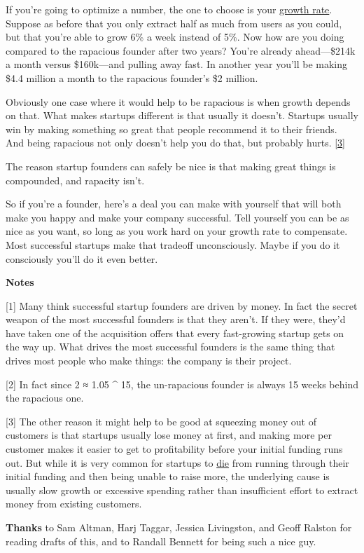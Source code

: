 If you're going to optimize a number, the one to choose is your
\href{http://www.paulgraham.com/growth.html}{growth rate}. Suppose as before that you only extract half as much
from users as you could, but that you're able to grow 6\% a week
instead of 5\%.  Now how are you doing compared to the rapacious
founder after two years?  You're already ahead---\$214k a month
versus \$160k---and pulling away fast.  In another year you'll be
making \$4.4 million a month to the rapacious founder's \$2 million.

Obviously one case where it would help to be rapacious is when
growth depends on that.  What makes startups different is that
usually it doesn't. Startups usually win by making something so
great that people recommend it to their friends.  And being rapacious
not only doesn't help you do that, but probably hurts.  
[\href{\#f3n}{3}]

The reason startup founders can safely be nice is that making great
things is compounded, and rapacity isn't.

So if you're a founder, here's a deal you can make with yourself
that will both make you happy and make your company successful.
Tell yourself you can be as nice as you want, so long as you work
hard on your growth rate to compensate.  Most successful startups
make that tradeoff unconsciously. Maybe if you do it consciously
you'll do it even better.







\textbf{Notes}

[1]
Many think successful startup founders are driven by money.
In fact the secret weapon of the most successful founders is that
they aren't.  If they were, they'd have taken one of the acquisition
offers that every fast-growing startup gets on the way up.  What
drives the most successful founders is the same thing that drives
most people who make things: the company is their project.

[2]
In fact since 2 ≈ 1.05 \textasciicircum{} 15, the un-rapacious founder is
always 15 weeks behind the rapacious one.

[3]
The other reason it might help to be good at squeezing money
out of customers is that startups usually lose money at first, and
making more per customer makes it easier to get to profitability
before your initial funding runs out.  But while it is very common
for startups to \href{http://www.paulgraham.com/pinch.html}{die}
from running through their initial funding and then being unable
to raise more, the underlying cause is usually slow growth or
excessive spending rather than insufficient effort to extract money
from existing customers.



\textbf{Thanks} to Sam Altman, Harj Taggar, Jessica Livingston, and
Geoff Ralston for reading drafts of this, and to Randall Bennett
for being such a nice guy.




